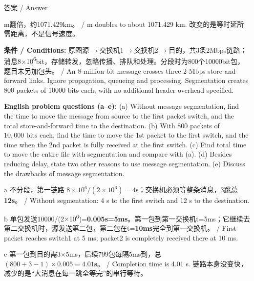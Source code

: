 \begin{StudySolution}{答案 / Answer}


m翻倍，约1071.429km。 / m doubles to about 1071.429 km. 改变的是等时延所需距离，不是信号速度。


\end{StudySolution}








\textbf{条件 / Conditions:} 原图源\ensuremath{\to}交换机1\ensuremath{\to}交换机2\ensuremath{\to}目的，共3条2Mbps链路；消息8\ensuremath{\times}10\textsuperscript{6}bit，存储转发，忽略传播、排队和处理。分段时为800个10000bit包，题目未另加包头。 / An 8-million-bit message crosses three 2-Mbps store-and-forward links. Ignore propagation, queueing and processing. Segmentation creates 800 packets of 10000 bits each, with no additional header overhead specified.

\textbf{English problem questions (a–e):} (a) Without message segmentation, find the time to move the message from source to the first packet switch, and the total store-and-forward time to the destination. (b) With 800 packets of \(10{,}000\text{ bits}\) each, find the time to move the 1st packet to the first switch, and the time when the 2nd packet is fully received at the first switch. (c) Find total time to move the entire file with segmentation and compare with (a). (d) Besides reducing delay, state two other reasons to use message segmentation. (e) Discuss the drawbacks of message segmentation.




a 不分段，第一链路 \(8\times10^6/(2\times10^6)=4\)s；交换机必须等整条消息，3跳总\textbf{12s}。 / Without segmentation: 4 s to the first switch and 12 s to the destination.


b 单包发送10000/(2\ensuremath{\times}10\textsuperscript{6})=\textbf{0.005s=5ms}。第一包到第一交换机t=5ms；它继续去第二交换机时，源发送第二包，第二包在t=\textbf{10ms}完全到第一交换机。 / First packet reaches switch1 at 5 ms; packet2 is completely received there at 10 ms.


c 第一包到目的需3\ensuremath{\times}5ms，后续799包每隔5ms到，总 \((800+3-1)\times0.005=\mathbf{4.01s}\)。 / Completion time is 4.01 s. 链路本身没变快，减少的是“大消息在每一跳全等完”的串行等待。


